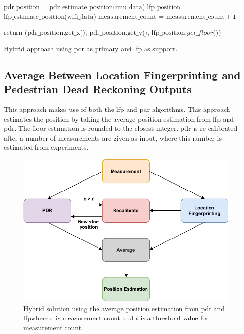 \begin{algorithm}[H]
\SetAlgoLined
{}
  $\text{pdr\_position}$ = $\text{pdr\_estimate\_position}$($\text{imu\_data}$)\;
  $\text{lfp\_position}$ = $\text{lfp\_estimate\_position}$($\text{wifi\_data}$)\;
  $\text{measurement\_count}$ = $\text{measurement\_count} + 1$\;
  
  
  return ($\text{pdr\_position.get\_x}$(), $\text{pdr\_position.get\_y}$(), $\text{lfp\_position}.get\_floor$())\;
 \caption{Hybrid approach using \gls{pdr} as primary and \gls{lfp} as support.}
 \label{alg:pdrml_hybrid}
\end{algorithm}

\subsection{Average Between Location Fingerprinting and Pedestrian Dead Reckoning Outputs}
This approach makes use of both the \gls{lfp} and \gls{pdr} algorithms. This approach estimates the position by taking the average position estimation from \gls{lfp} and \gls{pdr}. The floor estimation is rounded to the closest integer. \gls{pdr} is re-calibrated after a number of measurements are given as input, where this number is estimated from experiments.

\begin{figure}[H]
    \centering
    \includegraphics[scale=0.85]{Images/Experiments/hybrid/approach3.pdf}
    \caption{Hybrid solution using the average position estimation from \gls{pdr} and \gls{lfp}where $c$ is measurement count and $t$ is a threshold value for measurement count.}
     \label{fig:hybrid3}
\end{figure}

